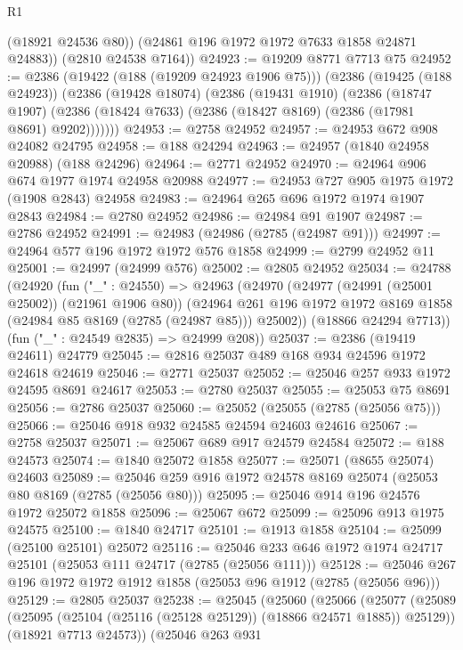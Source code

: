 \begin{lexlean}{R1}
\begin{coremodule}
          (@18921 @24536 @80))
        (@24861 @196 @1972 @1972 @7633 @1858 @24871 @24883))
      (@2810 @24538 @7164))
@24923 := @19209 @8771 @7713 @75
@24952 := @2386
    (@19422 (@188 (@19209 @24923 @1906 @75)))
    (@2386
      (@19425 (@188 @24923))
      (@2386
        (@19428 @18074)
        (@2386
          (@19431 @1910)
          (@2386
            (@18747 @1907)
            (@2386 (@18424 @7633) (@2386 (@18427 @8169) (@2386 (@17981 @8691) @9202)))))))
@24953 := @2758 @24952
@24957 := @24953 @672 @908 @24082 @24795
@24958 := @188 @24294
@24963 := @24957 (@1840 @24958 @20988) (@188 @24296)
@24964 := @2771 @24952
@24970 := @24964 @906 @674 @1977 @1974 @24958 @20988
@24977 := @24953 @727 @905 @1975 @1972 (@1908 @2843) @24958
@24983 := @24964 @265 @696 @1972 @1974 @1907 @2843
@24984 := @2780 @24952
@24986 := @24984 @91 @1907
@24987 := @2786 @24952
@24991 := @24983 (@24986 (@2785 (@24987 @91)))
@24997 := @24964 @577 @196 @1972 @1972 @576 @1858
@24999 := @2799 @24952 @11
@25001 := @24997 (@24999 @576)
@25002 := @2805 @24952
@25034 := @24788
    (@24920
      (fun ("_" : @24550) =>
      @24963
        (@24970
          (@24977 (@24991 (@25001 @25002)) (@21961 @1906 @80))
          (@24964 @261 @196 @1972 @1972 @8169 @1858 (@24984 @85 @8169 (@2785 (@24987 @85))) @25002))
        (@18866 @24294 @7713))
      (fun ("_" : @24549 @2835) => @24999 @208))
@25037 := @2386 (@19419 @24611) @24779
@25045 := @2816 @25037 @489 @168 @934 @24596 @1972 @24618 @24619
@25046 := @2771 @25037
@25052 := @25046 @257 @933 @1972 @24595 @8691 @24617
@25053 := @2780 @25037
@25055 := @25053 @75 @8691
@25056 := @2786 @25037
@25060 := @25052 (@25055 (@2785 (@25056 @75)))
@25066 := @25046 @918 @932 @24585 @24594 @24603 @24616
@25067 := @2758 @25037
@25071 := @25067 @689 @917 @24579 @24584
@25072 := @188 @24573
@25074 := @1840 @25072 @1858
@25077 := @25071 (@8655 @25074) @24603
@25089 := @25046 @259 @916 @1972 @24578 @8169 @25074 (@25053 @80 @8169 (@2785 (@25056 @80)))
@25095 := @25046 @914 @196 @24576 @1972 @25072 @1858
@25096 := @25067 @672
@25099 := @25096 @913 @1975 @24575
@25100 := @1840 @24717
@25101 := @1913 @1858
@25104 := @25099 (@25100 @25101) @25072
@25116 := @25046 @233 @646 @1972 @1974 @24717 @25101 (@25053 @111 @24717 (@2785 (@25056 @111)))
@25128 := @25046 @267 @196 @1972 @1972 @1912 @1858 (@25053 @96 @1912 (@2785 (@25056 @96)))
@25129 := @2805 @25037
@25238 := @25045
    (@25060
      (@25066
        (@25077
          (@25089 (@25095 (@25104 (@25116 (@25128 @25129)) (@18866 @24571 @1885)) @25129))
          (@18921 @7713 @24573))
        (@25046
          @263
          @931

\end{coremodule}
\end{lexlean}
